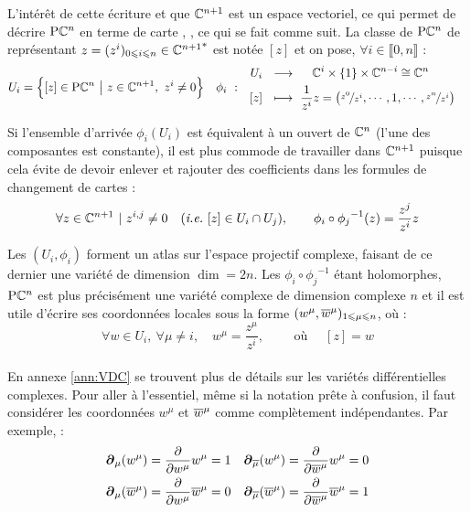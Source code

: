 L'intérêt de cette écriture et que $\mathbb{C}^{n+1}$ est un espace vectoriel, ce qui permet de décrire $\text{\normalfont P}\mathbb{C}^{n}$ en terme de carte \cite[lemme 2.17, p. 64]{lafontaine_introduction_2015}, \cite[chap. 2]{ballmann_lectures_2006}, ce qui se fait comme suit.
La classe de $\text{\normalfont P}\mathbb{C}^{n}$ de représentant $z = (z^i)_{0\leqslant i\leqslant n}\in{\mathbb{C}^{n+1}}^*$ est notée $[z]$ et on pose, $\forall i\in\llbracket0,n\rrbracket$ :
\begin{align}
	U_i &= \Big\{[z]\in\text{\normalfont P}\mathbb{C}^{n}\ \big|\ z\in \mathbb{C}^{n+1},\ z^i\neq 0\Big\}  &  \phi_i\  :\quad &\begin{aligned}
		U_i\ \ &\longrightarrow\quad\ \mathbb{C}^{i}\times \{1\} \times\mathbb{C}^{n-i}\cong \mathbb{C}^{n} \\ [z]\ \ &\longmapsto\ \frac{1}{z^i}z = \big(\nicefrac{z^0}{z^i},\cdots, 1, \cdots, \nicefrac{z^n}{z^i}\big)
	\end{aligned}
\end{align}
\begin{remarque}
	Si l'ensemble d'arrivée $\phi_i(U_i)$ est équivalent à un ouvert de $\mathbb{C}^{n}$ (l'une des composantes est constante), il est plus commode de travailler dans $\mathbb{C}^{n+1}$ puisque cela évite de devoir enlever et rajouter des coefficients dans les formules de changement de cartes :
	\[ \forall z\in\mathbb{C}^{n+1}\ |\ z^{i,j}\neq 0\quad (\textit{i.e.}~[z]\in U_i\cap U_j) ,\qquad \phi_i \circ {\phi_j}^{-1}(z) = \frac{z^j}{z^i}z\]
\end{remarque}
\skipl
Les $(U_i,\phi_i)$ forment un atlas sur l'espace projectif complexe, faisant de ce dernier une variété de dimension $\dim = 2n$. Les $\phi_i \circ {\phi_j}^{-1}$ étant holomorphes, $\text{\normalfont P}\mathbb{C}^{n}$ est plus précisément une variété complexe de dimension complexe $n$ et il est utile d'écrire ses coordonnées locales sous la forme $(w^\mu, \overline{w}^\mu)_{1\leqslant \mu \leqslant n}$, où :
\[\forall w\in U_i,\ \forall \mu\neq i,\quad w^\mu = \frac{z^\mu}{z^i},\qquad  \text{ où }\quad [z] = w\]
\\
En annexe \ref{ann:VDC} se trouvent plus de détails sur les variétés différentielles complexes. Pour aller à l'essentiel, même si la notation prête à confusion, il faut considérer les coordonnées $w^\mu$ et $\overline{w}^\mu$ comme complètement indépendantes.
Par exemple, :
\begin{align*}
	\boldsymbol{\partial}_\mu(w^\mu) &= \frac{\partial}{\partial w^\mu} w^\mu = 1  &  
	\boldsymbol{\partial}_{\overline{\mu}}(w^\mu) = \frac{\partial}{\partial \overline{w}^\mu} w^\mu &= 0 
		\\
	\boldsymbol{\partial}_\mu(\overline{w}^\mu) &= \frac{\partial}{\partial w^\mu} \overline{w}^\mu = 0  &  
	\boldsymbol{\partial}_{\overline{\mu}}(\overline{w}^\mu) = \frac{\partial}{\partial \overline{w}^\mu} \overline{w}^\mu &= 1
\end{align*}
